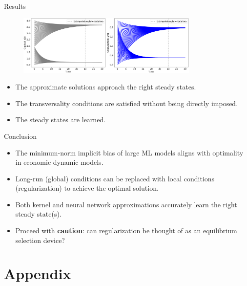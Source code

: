 \documentclass[aspectratio=169,10pt]{beamer}
\newcommand{\emphcolor}[1]{\textbf{\textcolor{emphcolorval}{#1}}}
\begin{document}
\begin{frame}{Results}
	\begin{figure}[t!]
		\centering
		\includegraphics[width=0.8\textwidth]{figs/neoclassical_growth_model_concave_convex_threshold.pdf}
		\vspace{-4mm}
	\end{figure}
	\begin{itemize}
		\item The approximate solutions approach the right steady states.
		\vspace{0.1in}
		\item The transversality conditions are satisfied without being directly imposed.
		\vspace{0.1in}
		\item The steady states are learned.
	\end{itemize}
\end{frame}

\begin{frame}{Conclusion}
	\begin{itemize}
		\item The minimum-norm implicit bias of large ML models aligns with optimality in economic dynamic models.
		\item Long-run (global) conditions can be replaced with local conditions (regularization) to achieve the optimal solution.
		\vspace{0.1in}
		\item Both kernel and neural network approximations accurately learn the right steady state(s).
		\vspace{0.1in}
		\item Proceed with \emphcolor{caution}: can regularization be thought of as an equilibrium selection device?
	\end{itemize}
\end{frame}

\section{Appendix}
\end{document}
